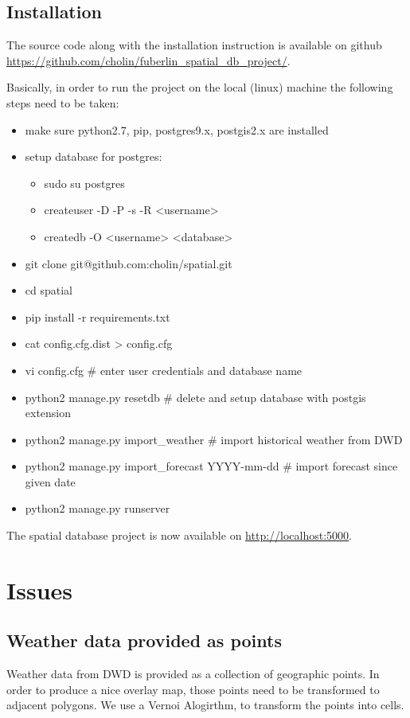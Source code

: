 \documentclass[english]{lni}
\begin{document}
\subsection{Installation}

The source code along with the installation instruction is available on github \url{https://github.com/cholin/fuberlin_spatial_db_project/}.

Basically, in order to run the project on the local (linux) machine the following steps need to be taken:

\begin{itemize}
\item make sure python2.7, pip,  postgres9.x, postgis2.x are installed
\item setup database for postgres:
\begin{itemize}
\item sudo su postgres
\item createuser -D -P -s -R <username>
\item createdb -O <username> <database>
\end{itemize}
\item git clone git@github.com:cholin/spatial.git
\item cd spatial
\item pip install -r requirements.txt
\item cat config.cfg.dist > config.cfg
\item vi config.cfg \# enter user credentials and database name
\item python2 manage.py resetdb \# delete and setup database with postgis extension
\item python2 manage.py import\_weather  \# import historical weather from DWD
\item python2 manage.py import\_forecast YYYY-mm-dd \# import forecast since given date  
\item python2 manage.py runserver
\end{itemize}

The spatial database project is now available on \url{http://localhost:5000}.

\section{Issues}
\subsection{Weather data provided as points}
Weather data from DWD is provided as a collection of geographic points. In order to produce a nice overlay map, those points need to be transformed to adjacent polygons. We use a Vernoi Alogirthm, to transform the points into cells.
\end{document}
